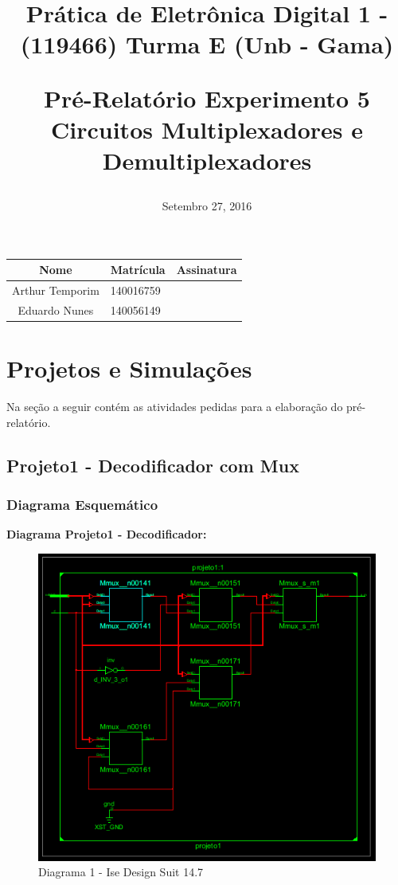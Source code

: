 \documentclass[12pts]{article}
\title{
	Prática de Eletrônica Digital 1 - (119466)
	\singlespacing
		Turma E (Unb - Gama)
	\singlespacing
	\begin{midpage}
	\begin {large}
		Pré-Relatório Experimento 5
		\singlespace
		Circuitos Multiplexadores e Demultiplexadores
	\end {large}
	\end{midpage}
}
\date{Setembro 27, 2016}
\begin{document}
\maketitle	
\begin{center}

\begin{tabular}{|c|l|r|}
\hline
Nome & Matrícula & Assinatura\\
\hline
Arthur Temporim & 140016759 & \\
\hline	
Eduardo Nunes & 140056149 & \\
\hline	
\end{tabular}

\end{center}

\pagebreak

\section{Projetos e Simulações}

	Na seção a seguir contém as atividades pedidas para a elaboração do pré-relatório.
	
\subsection{Projeto1 - Decodificador com Mux}
\subsubsection{Diagrama Esquemático}

\textbf{Diagrama Projeto1 - Decodificador:}

\begin{figure}[!htb]
  \centering
  \includegraphics[scale=0.7	]{imagens/esquematico_projeto1}
  \caption{Diagrama 1 - Ise Design Suit 14.7}
  \label{figRotulo}
\end{figure}
\end{document}
